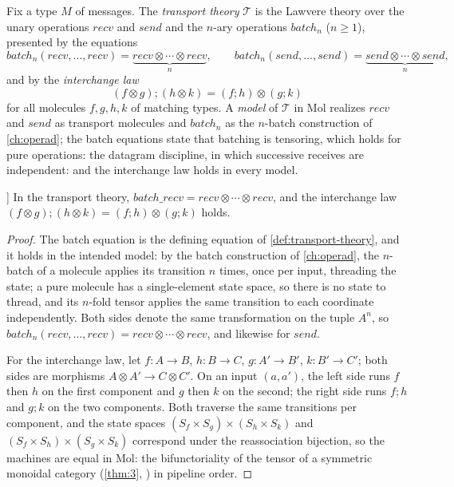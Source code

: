 \begin{definition}
\label{def:transport-theory}
Fix a type $M$ of messages. The \emph{transport theory} $\mathcal{T}$ is
the Lawvere theory over the unary operations $\mathit{recv}$ and
$\mathit{send}$ and the $n$-ary operations $\mathit{batch}_{n}$
($n \geq 1$), presented by the equations
\[
\mathit{batch}_{n} (\mathit{recv},\ldots,\mathit{recv})
= \underbrace{\mathit{recv} \otimes \cdots \otimes \mathit{recv}}_{n},
\qquad
\mathit{batch}_{n} (\mathit{send},\ldots,\mathit{send})
= \underbrace{\mathit{send} \otimes \cdots \otimes \mathit{send}}_{n},
\]
and by the \emph{interchange law}
\[
(f \otimes g);(h \otimes k) = (f;h) \otimes (g;k)
\]
for all molecules $f,g,h,k$ of matching types. A \emph{model} of
$\mathcal{T}$ in Mol realizes $\mathit{recv}$ and $\mathit{send}$ as
transport molecules and $\mathit{batch}_{n}$ as the $n$-batch construction
of \autoref{ch:operad}; the batch equations state that batching is
tensoring, which holds for pure operations: the datagram discipline, in
which successive receives are independent: and the interchange law holds
in every model.
\end{definition}

\begin{theorem}[Transport theory (\autoref{thm:11}) [N]]\label{thm:11}
In the transport theory, $\mathit{batch\_recv} = \mathit{recv} \otimes
\cdots \otimes \mathit{recv}$, and the interchange law
$(f \otimes g);(h \otimes k) = (f;h) \otimes (g;k)$ holds.
\end{theorem}

\begin{proof}
The batch equation is the defining equation of
\autoref{def:transport-theory}, and it holds in the intended model: by the
batch construction of \autoref{ch:operad}, the $n$-batch of a molecule
applies its transition $n$ times, once per input, threading the state; a
pure molecule has a single-element state space, so there is no state to
thread, and its $n$-fold tensor applies the same transition to each
coordinate independently. Both sides denote the same transformation on the
tuple $A^{n}$, so $\mathit{batch}_{n} (\mathit{recv},\ldots,\mathit{recv})
= \mathit{recv} \otimes \cdots \otimes \mathit{recv}$, and likewise for
$\mathit{send}$.

For the interchange law, let $f : A \to B$, $h : B \to C$, $g : A' \to B'$,
$k : B' \to C'$; both sides are morphisms $A \otimes A' \to C \otimes C'$.
On an input $(a,a')$, the left side runs $f$ then $h$ on the first
component and $g$ then $k$ on the second; the right side runs $f;h$ and
$g;k$ on the two components. Both traverse the same transitions per
component, and the state spaces $(S_{f} \times S_{g}) \times (S_{h} \times
S_{k})$ and $(S_{f} \times S_{h}) \times (S_{g} \times S_{k})$ correspond
under the reassociation bijection, so the machines are equal in Mol: the
bifunctoriality of the tensor of a symmetric monoidal category
(\autoref{thm:3}, \cite{maclane}) in pipeline order.
\end{proof}

